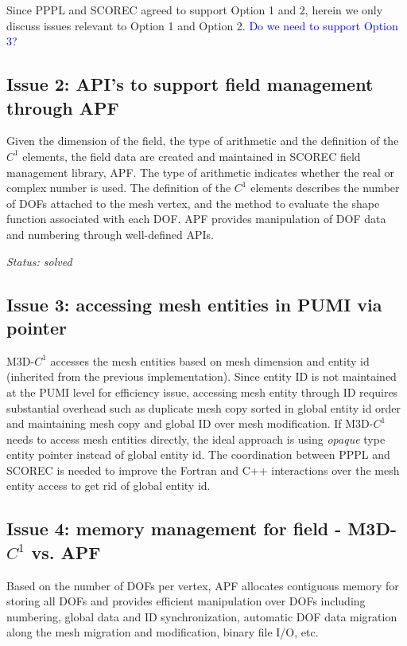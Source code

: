 \documentclass[11pt]{article}  %
\begin{document}
Since PPPL and SCOREC agreed to support Option 1 and 2, herein we only discuss issues relevant to Option 1 and Option 2. \textcolor{blue}{Do we need to support Option 3?}

\subsection{Issue 2: API's to support field management through APF}

Given the dimension of the field, the type of arithmetic and the definition of the $C^1$ elements, the field data are created and maintained in SCOREC field management library, APF.  The type of arithmetic indicates whether the real or complex number is used. The definition of the $C^1$ elements describes the number of DOFs attached to the mesh vertex, and the method to evaluate the shape function associated with each DOF. APF provides manipulation of DOF data and numbering through well-defined APIs.

\textit{Status: solved}

\subsection{Issue 3: accessing mesh entities in PUMI via pointer}
M3D-$C^1$ accesses the mesh entities based on mesh dimension and entity id (inherited from the previous implementation). Since entity ID is not maintained at the PUMI level for efficiency issue, accessing mesh entity through ID requires substantial overhead such as duplicate mesh copy sorted in global entity id order and maintaining mesh copy and global ID over mesh modification. If M3D-$C^1$ needs to access mesh entities directly, the ideal approach is using \emph{opaque} type entity pointer instead of global entity id. The coordination between PPPL and SCOREC is needed to improve the Fortran and C++ interactions over the mesh entity access to get rid of global entity id.

\subsection{Issue 4: memory management for field - M3D-$C^1$ vs. APF}

Based on the number of DOFs per vertex, APF allocates contiguous memory for storing all DOFs and provides efficient manipulation over DOFs including numbering, global data and ID synchronization, automatic DOF data migration along the mesh migration and modification, binary file I/O, etc. 
\end{document}

